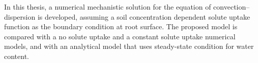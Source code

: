 In this thesis, a numerical mechanistic solution for the equation of convection--dispersion is developed, assuming a soil concentration dependent solute uptake function as the boundary condition at root surface. The proposed model is compared with a no solute uptake and a constant solute uptake numerical models, and with an analytical model that uses steady-state condition for water content. 


